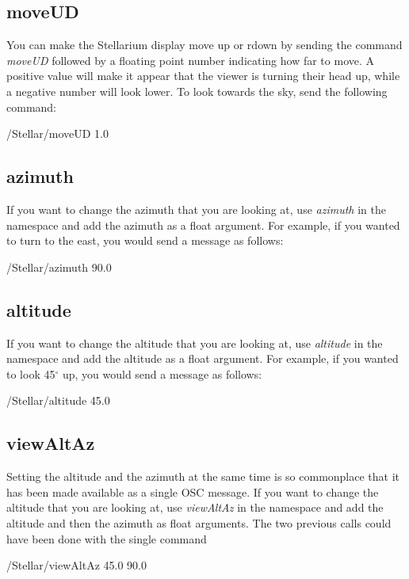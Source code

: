 \subsection{moveUD}
You can make the Stellarium display move up or rdown by sending the command \textit{moveUD} followed by a floating point number indicating how far to move. A positive value will make it appear that the viewer is turning their head up, while a negative number will look lower. To look towards the sky, send the following command:
\begin{syntax}	
	\medskip
	/Stellar/moveUD 1.0
	\medskip
\end{syntax}
\bigskip

\subsection{azimuth}
If you want to change the azimuth that you are looking at, use \textit{azimuth} in the namespace and add the azimuth as a float argument. For example, if you wanted to turn to the east, you would send a message as follows:
 \begin{syntax}	
	\medskip
	/Stellar/azimuth 90.0
	\medskip
\end{syntax}

\subsection{altitude}
If you want to change the altitude that you are looking at, use \textit{altitude} in the namespace and add the altitude as a float argument. For example, if you wanted to look 45$^{\circ}$ up, you would send a message as follows:
\begin{syntax}	
	\medskip
	/Stellar/altitude 45.0
	\medskip
\end{syntax}

\subsection{viewAltAz}
Setting the altitude and the azimuth at the same time is so commonplace that it has been made available as a single OSC message.
If you want to change the altitude that you are looking at, use \textit{viewAltAz} in the namespace and add the altitude and then the azimuth as float arguments. The two previous calls could have been done with the single command
\begin{syntax}	
	\medskip
	/Stellar/viewAltAz 45.0 90.0
	\medskip
\end{syntax}

